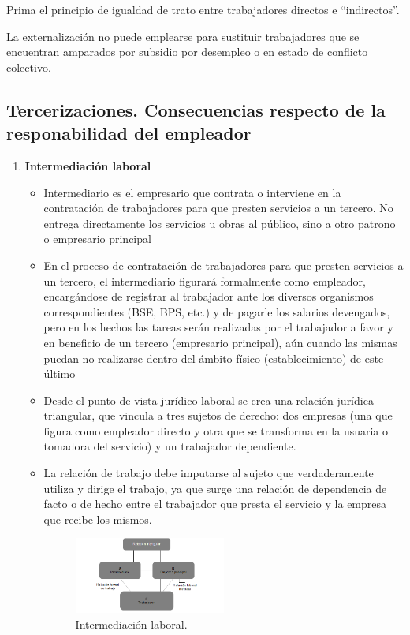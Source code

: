 \documentclass[spanish,12pt,a4paper,titlepage]{report}
\begin{document}
Prima el principio de igualdad de trato entre trabajadores directos e “indirectos”.

La externalización no puede emplearse para sustituir trabajadores que se encuentran amparados por subsidio por desempleo o en estado de conflicto colectivo.

\subsection{Tercerizaciones. Consecuencias respecto de la responabilidad del empleador}
\begin{enumerate}
\item \textbf{Intermediación laboral}
  \begin{itemize}
\item Intermediario es el empresario que contrata o interviene en la contratación de trabajadores para que presten servicios a un tercero. No entrega directamente los servicios u obras al público, sino a otro patrono o empresario principal

\item En el proceso de contratación de trabajadores para que presten servicios a un tercero, el intermediario figurará formalmente como empleador, encargándose de registrar al trabajador ante los diversos organismos correspondientes (BSE, BPS, etc.) y de pagarle los salarios devengados, pero en los hechos las tareas serán realizadas por el trabajador a favor y en beneficio de un tercero (empresario principal), aún cuando las mismas puedan no realizarse dentro del ámbito físico (establecimiento) de este último

\item Desde el punto de vista jurídico laboral se crea una relación jurídica triangular, que vincula a tres sujetos de derecho: dos empresas (una que figura como empleador directo y otra que se transforma en la usuaria o tomadora del servicio) y un trabajador dependiente.

\item La relación de trabajo debe imputarse al sujeto que verdaderamente utiliza y dirige el trabajo, ya que surge una relación de dependencia de facto o de hecho entre el trabajador que presta el servicio y la empresa que recibe los mismos.

\begin{figure}[H]
\centering
\includegraphics[width=0.5\textwidth]{rel_tri.png}
\caption{Intermediación laboral.}
\end{figure}



\end{itemize}
\end{enumerate}
\end{document}
